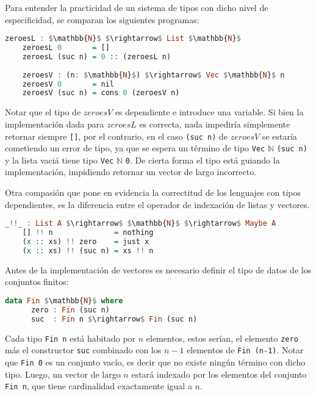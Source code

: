 \documentclass[]{report}
\begin{document}
	Para entender la practicidad de un sistema de tipos con dicho nivel de especificidad, se comparan los siguientes programas:
	\begin{lstlisting}[mathescape, language=Haskell]
	zeroesL : $\mathbb{N}$ $\rightarrow$ List $\mathbb{N}$
	zeroesL 0       = []
	zeroesL (suc n) = 0 :: (zeroesL n)
	
	zeroesV : (n: $\mathbb{N}$) $\rightarrow$ Vec $\mathbb{N}$ n
	zeroesV 0       = nil
	zeroesV (suc n) = cons 0 (zeroesV n)
	\end{lstlisting}
	
	Notar que el tipo de $zeroesV$ es dependiente e introduce una variable.
	Si bien la implementación dada para $zeroesL$ es correcta, nada impediría simplemente retornar siempre \verb|[]|, por el contrario, en el caso \verb|(suc n)| de $zeroesV$ se estaría cometiendo un error de tipo, ya que se espera un término de tipo \verb|Vec| $\mathbb{N}$ \verb|(suc n)| y la lista vaciá tiene tipo \verb|Vec| $\mathbb{N}$ \verb|0|.
	De cierta forma el tipo está guiando la implementación, impidiendo retornar un vector de largo incorrecto.
	
	Otra compasión que pone en evidencia la correctitud de los lenguajes con tipos dependientes, es la diferencia entre el operador de indexación de listas y vectores.
	
	\begin{lstlisting}[mathescape, language=Haskell]
	_!!_ : List A $\rightarrow$ $\mathbb{N}$ $\rightarrow$ Maybe A
	[] !! n              = nothing
	(x :: xs) !! zero    = just x
	(x :: xs) !! (suc n) = xs !! n
	\end{lstlisting}
	
	Antes de la implementación de vectores es necesario definir el tipo de datos de los conjuntos finitos:
	
	\begin{lstlisting}[mathescape, language=Haskell]
	data Fin $\mathbb{N}$ where
	  zero : Fin (suc n)
	  suc  : Fin n $\rightarrow$ Fin (suc n)
	\end{lstlisting}
	
	Cada tipo \verb|Fin n| está habitado por $n$ elementos, estos serían, el elemento \verb|zero| más el constructor \verb|suc| combinado con los $n-1$ elementos de \verb|Fin (n-1)|. Notar que \verb|Fin 0| es un conjunto vacío, es decir que no existe ningún término con dicho tipo.
	Luego, un vector de largo $n$ estará indexado por los elementos del conjunto \verb|Fin n|, que tiene cardinalidad exactamente igual a $n$.
	
\end{document}
